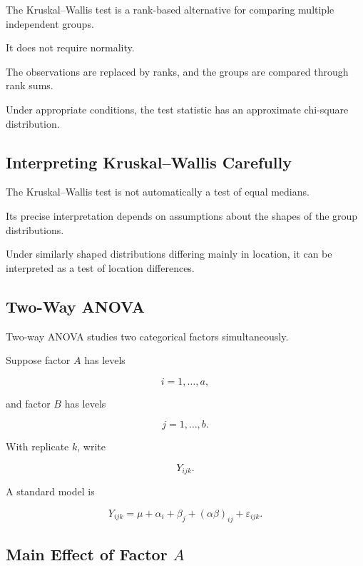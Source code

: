The Kruskal--Wallis test is a rank-based alternative for comparing
multiple independent groups.

It does not require normality.

The observations are replaced by ranks, and the groups are compared
through rank sums.

Under appropriate conditions, the test statistic has an approximate
chi-square distribution.

\subsection{Interpreting Kruskal--Wallis Carefully}
\label{subsec:kruskal-wallis-interpretation}

The Kruskal--Wallis test is not automatically a test of equal medians.

Its precise interpretation depends on assumptions about the shapes of the
group distributions.

Under similarly shaped distributions differing mainly in location, it can
be interpreted as a test of location differences.

\subsection{Two-Way ANOVA}
\label{subsec:two-way-anova}

Two-way ANOVA studies two categorical factors simultaneously.

Suppose factor \(A\) has levels

\[
i=1,\ldots,a,
\]

and factor \(B\) has levels

\[
j=1,\ldots,b.
\]

With replicate \(k\), write

\[
Y_{ijk}.
\]

A standard model is

\[
\boxed{
Y_{ijk}
=
\mu
+
\alpha_i
+
\beta_j
+
(\alpha\beta)_{ij}
+
\varepsilon_{ijk}.
}
\]

\subsection{Main Effect of Factor \(A\)}
\label{subsec:main-effect-a}

